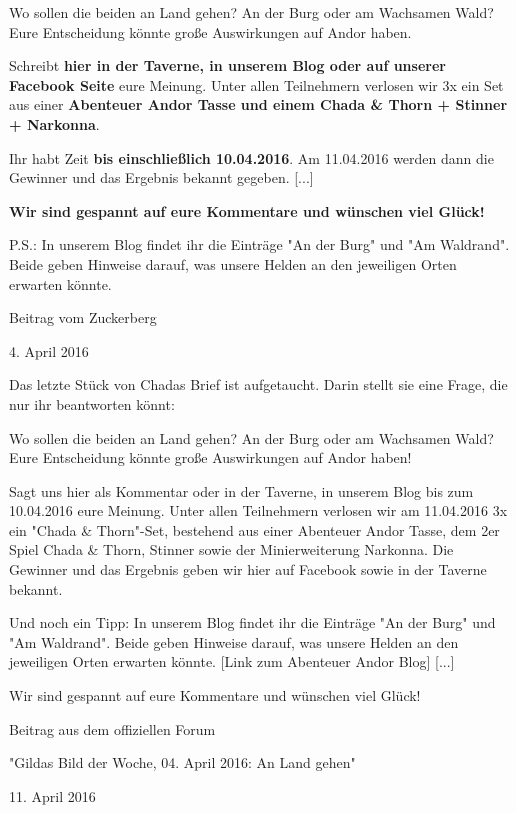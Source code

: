 \documentclass[10pt, a4paper, oneside]{book}
\begin{document}
\begin{multicols}{2}
Wo sollen die beiden an Land gehen? An der Burg oder am Wachsamen Wald? Eure Entscheidung könnte große Auswirkungen auf Andor haben.

Schreibt \textbf{hier in der Taverne, in unserem Blog oder auf unserer Facebook Seite} eure Meinung. Unter allen Teilnehmern verlosen wir 3x ein Set aus einer \textbf{Abenteuer Andor Tasse und einem Chada \& Thorn + Stinner + Narkonna}.

Ihr habt Zeit \textbf{bis einschließlich 10.04.2016}. Am 11.04.2016 werden dann die Gewinner und das Ergebnis bekannt gegeben. [...]


\textbf{Wir sind gespannt auf eure Kommentare und wünschen viel Glück!}


P.S.: In unserem Blog findet ihr die Einträge "An der Burg" und "Am Waldrand". Beide geben Hinweise darauf, was unsere Helden an den jeweiligen Orten erwarten könnte.


\begin{center}
    Beitrag vom Zuckerberg

    4. April 2016
\end{center}

Das letzte Stück von Chadas Brief ist aufgetaucht. Darin stellt sie eine Frage, die nur ihr beantworten könnt:

Wo sollen die beiden an Land gehen? An der Burg oder am Wachsamen Wald? Eure Entscheidung könnte große Auswirkungen auf Andor haben!

Sagt uns hier als Kommentar oder in der Taverne, in unserem Blog bis zum 10.04.2016 eure Meinung. Unter allen Teilnehmern verlosen wir am 11.04.2016 3x ein "Chada \& Thorn"-Set, bestehend aus einer Abenteuer Andor Tasse, dem 2er Spiel Chada \& Thorn, Stinner sowie der Minierweiterung Narkonna. Die Gewinner und das Ergebnis geben wir hier auf Facebook sowie in der Taverne bekannt.

Und noch ein Tipp: In unserem Blog findet ihr die Einträge "An der Burg" und "Am Waldrand". Beide geben Hinweise darauf, was unsere Helden an den jeweiligen Orten erwarten könnte. [Link zum Abenteuer Andor Blog] [...]

Wir sind gespannt auf eure Kommentare und wünschen viel Glück! 


\begin{center}
    Beitrag aus dem offiziellen Forum

    "Gildas Bild der Woche, 04. April 2016: An Land gehen"

    11. April 2016
\end{center}


\end{multicols}
\end{document}
